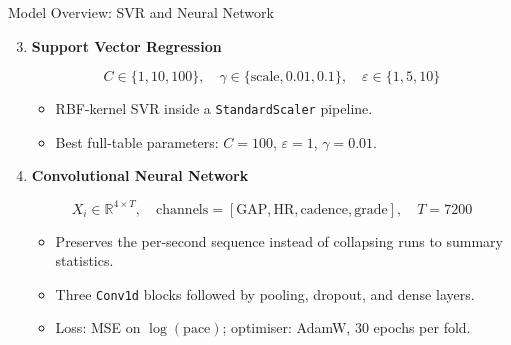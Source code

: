 \documentclass{beamer}
\begin{document}
\begin{frame}{Model Overview: SVR and Neural Network}

\begin{enumerate}
    \setcounter{enumi}{2}

    \item \textbf{Support Vector Regression}

    \vspace{0.15cm}

    \[
    C \in \{1, 10, 100\},
    \quad
    \gamma \in \{\text{scale}, 0.01, 0.1\},
    \quad
    \varepsilon \in \{1, 5, 10\}
    \]

    \vspace{0.15cm}

    \begin{itemize}
        \item RBF-kernel SVR inside a \texttt{StandardScaler} pipeline.
        \item Best full-table parameters: $C = 100$, $\varepsilon = 1$, $\gamma = 0.01$.
    \end{itemize}

    \vspace{0.3cm}

    \item \textbf{Convolutional Neural Network}

    \vspace{0.15cm}

    \[
    X_i \in \mathbb{R}^{4 \times T}, \quad
    \text{channels} = [\text{GAP}, \text{HR}, \text{cadence}, \text{grade}],
    \quad T = 7200
    \]

    \vspace{0.15cm}

    \begin{itemize}
        \item Preserves the per-second sequence instead of collapsing runs to summary statistics.
        \item Three \texttt{Conv1d} blocks followed by pooling, dropout, and dense layers.
        \item Loss: MSE on $\log(\text{pace})$; optimiser: AdamW, 30 epochs per fold.
    \end{itemize}

\end{enumerate}

\end{frame}
\end{document}
